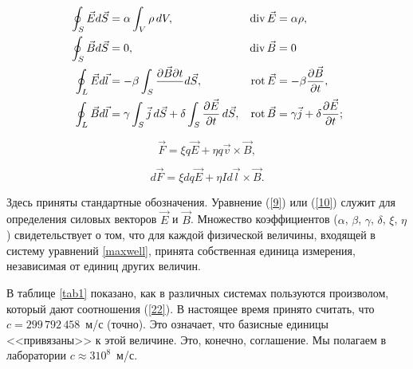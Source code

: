 \begin{gather}
	\eqmark[maxwell]
	\begin{aligned}
		\oint_S \vec{E}d\vec{S} &= \alpha\int_V\rho\,dV, & \Div \vec{E} &= \alpha\rho,\\
		\oint_S\vec{B}d\vec{S} &= 0, & \Div\vec{B} &= 0\\
		\oint_L\vec{E}d\vec{l} &= -\beta\int_S\frac{\partial{\vec{B}} \partial t}\,d\vec{S}, & \Rot\vec{E} &= -\beta\frac{\partial\vec B}{\partial t},\\
		\oint_L\vec{B}d\vec{l} &= \gamma\int_S\vec{j}\,d\vec{S}+\delta\int_S\frac{\partial{\vec{E}}}{\partial t}\,d\vec{S}, & \Rot\vec{B} &= \gamma\vec{j}+\delta\frac{\partial\vec E}{\partial t};
	\end{aligned}
\end{gather}

%

\begin{equation}
	\vec{F}=\xi q\vec{E}+\eta q\vec{v}\times\vec{B},
\end{equation}

\begin{equation}
	d\vec{F}=\xi dq\vec{E}+\eta Id\vec{l}\times\vec{B}.
\end{equation}

Здесь приняты стандартные обозначения. Уравнение (\eqref{9}) или (\eqref{10}) служит для определения силовых векторов $\vec{E}$ и
$\vec{B}$. Множество коэффициентов ($\alpha$, $\beta$, $\gamma$, $\delta$, $\xi$, $\eta$) свидетельствует о том, что для
каждой физической величины, входящей в систему уравнений \eqref{maxwell}, принята собственная единица измерения,
независимая от единиц других величин.


В таблице \ref{tab1} показано, как в различных системах пользуются произволом, который дают соотношения (\eqref{22}). В
настоящее время принято считать, что $c=299\,792\,458$~м/с (точно). Это означает, что базисные единицы <<привязаны>> к
этой величине. Это, конечно, соглашение. Мы полагаем в лаборатории $c \approx 3 10^8$~м/с.

\def\pp{\textbf}

